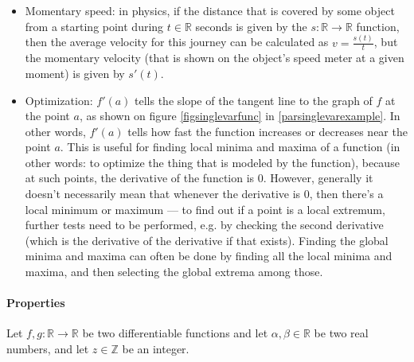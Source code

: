 \documentclass[titlepage]{article}
\begin{document}
            \begin{itemize}
              \item Momentary speed: in physics, if the distance that is covered
                    by some object from a starting point during
                    $t \in \mathbb{R}$ seconds is given by the
                    $s : \mathbb{R} \rightarrow \mathbb{R}$ function, then the
                    average velocity for this journey can be calculated as
                    $v = \frac{s(t)}{t}$, but the momentary velocity (that is
                    shown on the object's speed meter at a given moment) is
                    given by $s'(t)$.

              \item Optimization: $f'(a)$ tells the slope of the tangent line to
                    the graph of $f$ at the point $a$, as shown on figure
                    \ref{figsinglevarfunc} in \ref{parsinglevarexample}. In
                    other words, $f'(a)$ tells how fast the function increases
                    or decreases near the point $a$. This is useful for finding
                    local minima and maxima of a function (in other words: to
                    optimize the thing that is modeled by the function),
                    because at such points, the derivative of the function is
                    $0$. However, generally it doesn't necessarily mean that
                    whenever the derivative is $0$, then there's a local
                    minimum or maximum --- to find out if a point is a local
                    extremum, further tests need to be performed, e.g. by
                    checking the second derivative (which is the derivative of
                    the derivative if that exists).  Finding the global minima
                    and maxima can often be done by finding all the local
                    minima and maxima, and then selecting the global extrema
                    among those.
            \end{itemize}

          \paragraph{Properties}

            Let $f, g : \mathbb{R} \rightarrow \mathbb{R}$ be two differentiable
            functions and let $\alpha, \beta \in \mathbb{R}$ be two real
            numbers, and let $z \in \mathbb{Z}$ be an integer.
\end{document}
